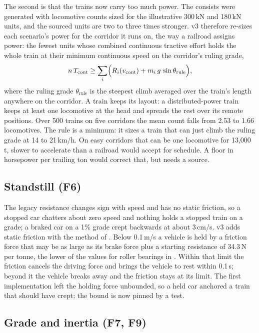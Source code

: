 The second is that the trains now carry too much power. The consists were generated with locomotive counts sized for the illustrative 300\,kN and 180\,kN units, and the sourced units are two to three times stronger. v3 therefore re-sizes each scenario's power for the corridor it runs on, the way a railroad assigns power: the fewest units whose combined continuous tractive effort holds the whole train at their minimum continuous speed on the corridor's ruling grade,
\begin{equation}
    n\,T_{\mathrm{cont}} \ge \sum_i \Bigl( R_i(v_{\mathrm{cont}}) + m_i\,g\,\sin\theta_{\mathrm{rule}} \Bigr),
    \label{eq:v3_power_sizing}
\end{equation}
where the ruling grade $\theta_{\mathrm{rule}}$ is the steepest climb averaged over the train's length anywhere on the corridor. A train keeps its layout: a distributed-power train keeps at least one locomotive at the head and spreads the rest over its remote positions. Over 500 trains on five corridors the mean count falls from 2.53 to 1.66 locomotives. The rule is a minimum: it sizes a train that can just climb the ruling grade at 14 to 21\,km/h. On easy corridors that can be one locomotive for 13,000\,t, slower to accelerate than a railroad would accept for schedule. A floor in horsepower per trailing ton would correct that, but needs a source.

\subsection{Standstill (F6)}

The legacy resistance changes sign with speed and has no static friction, so a stopped car chatters about zero speed and nothing holds a stopped train on a grade; a braked car on a 1\% grade crept backwards at about 3\,cm/s. v3 adds static friction with the method of \cite{Karnopp1985StickSlip}. Below 0.1\,m/s a vehicle is held by a friction force that may be as large as its brake force plus a starting resistance of 34.3\,N per tonne, the lower of the values for roller bearings in \cite[p.~468]{Cole2019HandbookLTD}. Within that limit the friction cancels the driving force and brings the vehicle to rest within 0.1\,s; beyond it the vehicle breaks away and the friction stays at its limit. The first implementation left the holding force unbounded, so a held car anchored a train that should have crept; the bound is now pinned by a test.

\subsection{Grade and inertia (F7, F9)}

